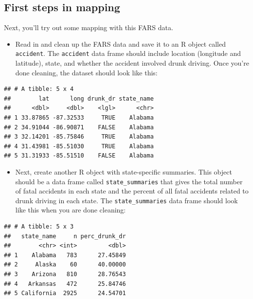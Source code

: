 \documentclass[]{book}
\providecommand{\tightlist}{%
  \setlength{\itemsep}{0pt}\setlength{\parskip}{0pt}}
\theoremstyle{definition}
\theoremstyle{definition}
\theoremstyle{definition}
\theoremstyle{remark}
\begin{document}
\subsection{First steps in mapping}\label{first-steps-in-mapping}

Next, you'll try out some mapping with this FARS data.

\begin{itemize}
\tightlist
\item
  Read in and clean up the FARS data and save it to an R object called
  \texttt{accident}. The \texttt{accident} data frame should include
  location (longitude and latitude), state, and whether the accident
  involved drunk driving. Once you're done cleaning, the dataset should
  look like this:
\end{itemize}

\begin{verbatim}
## # A tibble: 5 x 4
##        lat      long drunk_dr state_name
##      <dbl>     <dbl>    <lgl>      <chr>
## 1 33.87865 -87.32533     TRUE    Alabama
## 2 34.91044 -86.90871    FALSE    Alabama
## 3 32.14201 -85.75846     TRUE    Alabama
## 4 31.43981 -85.51030     TRUE    Alabama
## 5 31.31933 -85.51510    FALSE    Alabama
\end{verbatim}

\begin{itemize}
\tightlist
\item
  Next, create another R object with state-specific summaries. This
  object should be a data frame called \texttt{state\_summaries} that
  gives the total number of fatal accidents in each state and the
  percent of all fatal accidents related to drunk driving in each state.
  The \texttt{state\_summaries} data frame should look like this when
  you are done cleaning:
\end{itemize}

\begin{verbatim}
## # A tibble: 5 x 3
##   state_name     n perc_drunk_dr
##        <chr> <int>         <dbl>
## 1    Alabama   783      27.45849
## 2     Alaska    60      40.00000
## 3    Arizona   810      28.76543
## 4   Arkansas   472      25.84746
## 5 California  2925      24.54701
\end{verbatim}
\end{document}

